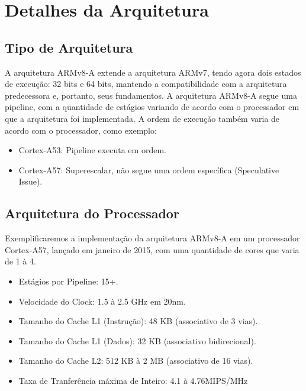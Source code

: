 \documentclass[12pt,a4paper,utf8]{ppgsi}
\begin{document}
\section{Detalhes da Arquitetura}
    \subsection{Tipo de Arquitetura}
        A arquitetura ARMv8-A extende a arquitetura ARMv7, tendo agora dois estados de execução: 32 bits e 64 bits, mantendo a compatibilidade com a arquitetura predecessora e, portanto, seus fundamentos.
        A arquitetura ARMv8-A segue uma pipeline, com a quantidade de estágios variando de acordo com o processador em que a arquitetura foi implementada. A ordem de execução também varia de acordo com o processador, como exemplo:
        \begin{itemize}
            \item Cortex-A53: Pipeline executa em ordem.
        \end{itemize}
        \begin{itemize}
            \item Cortex-A57: Superescalar, não segue uma ordem específica (Speculative Issue).
        \end{itemize}

    \subsection{Arquitetura do Processador}
        Exemplificaremos a implementação da arquitetura ARMv8-A em um processador Cortex-A57, lançado em janeiro de 2015, com uma quantidade de cores que varia de 1 à 4.
        \begin{itemize}
            \item Estágios por Pipeline: 15+.
        \end{itemize}
        \begin{itemize}
            \item Velocidade do Clock: 1.5 à 2.5 GHz em 20nm.
        \end{itemize}
        \begin{itemize}
            \item Tamanho do Cache L1 (Instrução): 48 KB (associativo de 3 vias).
        \end{itemize}
        \begin{itemize}
            \item Tamanho do Cache L1 (Dados): 32 KB (associativo bidirecional).
        \end{itemize}
        \begin{itemize}
            \item Tamanho do Cache L2: 512 KB à 2 MB (associativo de 16 vias).
        \end{itemize}
        \begin{itemize}
            \item Taxa de Tranferência máxima de Inteiro: 4.1 à 4.76MIPS/MHz
        \end{itemize}        
    


\nocite{manual}
\nocite{pressreal}
\nocite{pressarmv86}
\nocite{pressSdragon}
\nocite{bench}
\nocite{atomclose}
\end{document}

